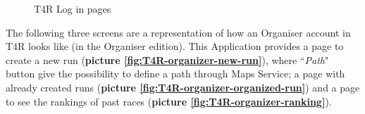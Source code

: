 \begin{figure}[H]
  \centering
  \caption{T4R Log in pages}
  \label{fig:T4R-login}
\end{figure}

The following three screens are a representation of how an Organiser account in T4R looks like (in the Organiser edition). This Application provides a page to create a new run (\textbf{picture \ref{fig:T4R-organizer-new-run}}), where ``\emph{Path}" button give the possibility to define a path through Maps Service; a page with already created runs (\textbf{picture \ref{fig:T4R-organizer-organized-run}}) and a page to see the rankings of past races (\textbf{picture \ref{fig:T4R-organizer-ranking}}).

